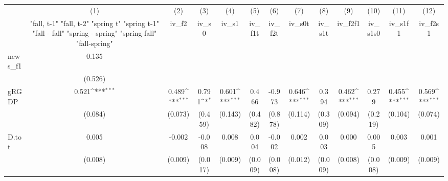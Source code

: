 {
\def\sym#1{\ifmmode^{#1}\else\(^{#1}\)\fi}
\begin{tabular}{l*{12}{c}}
\toprule
            &\multicolumn{1}{c}{(1)}&\multicolumn{1}{c}{(2)}&\multicolumn{1}{c}{(3)}&\multicolumn{1}{c}{(4)}&\multicolumn{1}{c}{(5)}&\multicolumn{1}{c}{(6)}&\multicolumn{1}{c}{(7)}&\multicolumn{1}{c}{(8)}&\multicolumn{1}{c}{(9)}&\multicolumn{1}{c}{(10)}&\multicolumn{1}{c}{(11)}&\multicolumn{1}{c}{(12)}\\
            &\multicolumn{1}{c}{  "fall, t-1" "fall, t-2" "spring t" "spring t-1"  "fall - fall" "spring - spring" "spring-fall" "fall-spring" }&\multicolumn{1}{c}{iv\_f2}&\multicolumn{1}{c}{iv\_s0}&\multicolumn{1}{c}{iv\_s1}&\multicolumn{1}{c}{iv\_f1t}&\multicolumn{1}{c}{iv\_f2t}&\multicolumn{1}{c}{iv\_s0t}&\multicolumn{1}{c}{iv\_s1t}&\multicolumn{1}{c}{iv\_f2f1}&\multicolumn{1}{c}{iv\_s1s0}&\multicolumn{1}{c}{iv\_s1f1}&\multicolumn{1}{c}{iv\_f2s1}\\
\midrule
news\_f1     &       0.135         &                     &                     &                     &                     &                     &                     &                     &                     &                     &                     &                     \\
            &     (0.526)         &                     &                     &                     &                     &                     &                     &                     &                     &                     &                     &                     \\
\addlinespace
gRGDP       &       0.521\sym{***}&       0.489\sym{***}&       0.791\sym{*}  &       0.601\sym{***}&       0.466         &      -0.973         &       0.646\sym{***}&       0.394         &       0.462\sym{***}&       0.279         &       0.455\sym{***}&       0.569\sym{***}\\
            &     (0.084)         &     (0.073)         &     (0.459)         &     (0.143)         &     (0.482)         &     (0.878)         &     (0.114)         &     (0.309)         &     (0.094)         &     (0.219)         &     (0.104)         &     (0.074)         \\
\addlinespace
D.tot       &       0.005         &      -0.002         &      -0.008         &       0.008         &       0.004         &      -0.002         &       0.002         &       0.003         &       0.000         &       0.005         &       0.003         &       0.001         \\
            &     (0.008)         &     (0.009)         &     (0.017)         &     (0.009)         &     (0.009)         &     (0.008)         &     (0.012)         &     (0.009)         &     (0.008)         &     (0.008)         &     (0.009)         &     (0.009)         \\

\end{tabular}}
